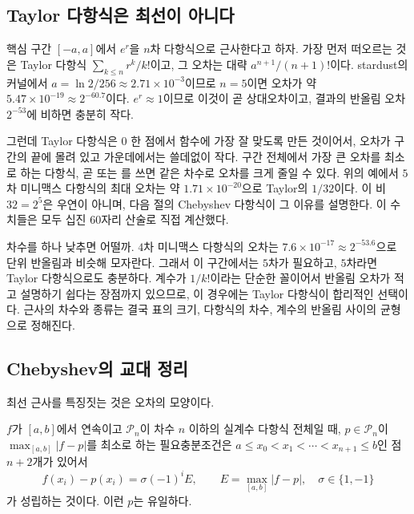 \subsection{Taylor 다항식은 최선이 아니다}

핵심 구간 $[-a,a]$에서 $e^r$을 $n$차 다항식으로 근사한다고 하자. 가장 먼저 떠오르는 것은 Taylor 다항식 $\sum_{k\le n}r^k/k!$이고, 그 오차는 대략 $a^{n+1}/(n+1)!$이다. stardust의  커널에서 $a=\ln2/256\approx2.71\times10^{-3}$이므로 $n=5$이면 오차가 약 $5.47\times10^{-19}\approx2^{-60.7}$이다. $e^r\approx1$이므로 이것이 곧 상대오차이고, 결과의 반올림 오차 $2^{-53}$에 비하면 충분히 작다.

그런데 Taylor 다항식은 $0$ 한 점에서 함수에 가장 잘 맞도록 만든 것이어서, 오차가 구간의 끝에 몰려 있고 가운데에서는 쓸데없이 작다. 구간 전체에서 가장 큰 오차를 최소로 하는 다항식, 곧  또는 를 쓰면 같은 차수로 오차를 크게 줄일 수 있다. 위의 예에서 $5$차 미니맥스 다항식의 최대 오차는 약 $1.71\times10^{-20}$으로 Taylor의 $1/32$이다. 이 비 $32=2^5$은 우연이 아니며, 다음 절의 Chebyshev 다항식이 그 이유를 설명한다. 이 수치들은 모두 십진 $60$자리 산술로 직접 계산했다.

차수를 하나 낮추면 어떨까. $4$차 미니맥스 다항식의 오차는 $7.6\times10^{-17}\approx2^{-53.6}$으로 단위 반올림과 비슷해 모자란다. 그래서 이 구간에서는 $5$차가 필요하고, $5$차라면 Taylor 다항식으로도 충분하다. 계수가 $1/k!$이라는 단순한 꼴이어서 반올림 오차가 적고 설명하기 쉽다는 장점까지 있으므로, 이 경우에는 Taylor 다항식이 합리적인 선택이다. 근사의 차수와 종류는 결국 표의 크기, 다항식의 차수, 계수의 반올림 사이의 균형으로 정해진다.

\subsection{Chebyshev의 교대 정리}

최선 근사를 특징짓는 것은 오차의 모양이다.

\begin{theorem}[Chebyshev의 교대 정리]
\label{thm:equioscillation}
$f$가 $[a,b]$에서 연속이고 $\mathcal P_n$이 차수 $n$ 이하의 실계수 다항식 전체일 때, $p\in\mathcal P_n$이 $\max_{[a,b]}|f-p|$를 최소로 하는 필요충분조건은 $a\le x_0<x_1<\cdots<x_{n+1}\le b$인 점 $n+2$개가 있어서
\[
f(x_i)-p(x_i)=\sigma(-1)^iE,\qquad E=\max_{[a,b]}|f-p|,\quad\sigma\in\{1,-1\}
\]
가 성립하는 것이다. 이런 $p$는 유일하다.
\end{theorem}

